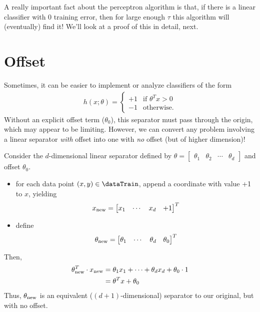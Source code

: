 A really important fact about the perceptron algorithm is that, if
there is a linear classifier with 0 training error, then
for large enough $\tau$
this algorithm will (eventually) find it!  We'll look at a proof of this in
detail, next.

\section{Offset}
\label{sec-offset}
Sometimes, it can be easier to implement or analyze classifiers of the
form
\begin{eqnarray*}
  h(x; \theta) =
  \begin{cases}
    +1 & \text{if } \theta^Tx > 0 \\
    -1 & \text{otherwise.}
  \end{cases}
\end{eqnarray*}
Without an explicit offset term ($\theta_0$), this separator must pass
through the origin, which may appear to be limiting. However, we can
convert any problem involving a linear separator \emph{with} offset
into one with \emph{no} offset (but of higher dimension)!

Consider the $d$-dimensional linear separator defined by
$\theta = \begin{bmatrix} \theta_1 & \theta_2 & \cdots
                         & \theta_d\end{bmatrix}$ and offset $\theta_0$.
\begin{itemize}
  \item for each data point
        $(x, y) \in \dataTrain$, append a coordinate with value +1 to $x$, yielding
        $$x_{\rm new} = \begin{bmatrix} x_1  & \cdots & x_d & +1 \end{bmatrix}^T$$
  \item define $$\theta_{\rm new} = \begin{bmatrix} \theta_1 & \cdots   &
                \theta_d & \theta_0\end{bmatrix}^T$$
\end{itemize}
Then,
\begin{align*}
  \theta_{\rm new}^T \cdot x_{\rm new} & = \theta_1x_1 + \cdots + \theta_dx_d
  + \theta_0 \cdot 1                                                          \\
                                       & = \theta^Tx + \theta_0
\end{align*}
Thus, $\theta_{\rm new}$ is an equivalent ($(d+1)$-dimensional) separator to
our original, but with no offset.

